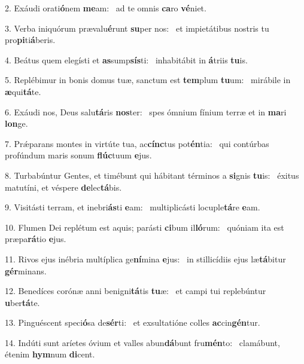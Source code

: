 2. Exáudi orati\textbf{ó}nem \textbf{me}am: \ast\  ad te omnis \textbf{ca}ro \textbf{vé}niet.\

3. Verba iniquórum prævalu\textbf{é}runt \textbf{su}per nos: \ast\  et impietátibus nostris tu pro\textbf{pi}ti\textbf{á}beris.\

4. Beátus quem elegísti et \textbf{as}sump\textbf{sís}ti: \ast\  inhabitábit in \textbf{á}triis \textbf{tu}is.\

5. Replébimur in bonis domus tuæ, sanctum est \textbf{tem}plum \textbf{tu}um: \ast\  mirábile in \textbf{æ}qui\textbf{tá}te.\

6. Exáudi nos, Deus salu\textbf{tá}ris \textbf{nos}ter: \ast\  spes ómnium fínium terræ et in \textbf{ma}ri \textbf{lon}ge.\

7. Prǽparans montes in virtúte tua, ac\textbf{cínc}tus pot\textbf{én}tia: \ast\  qui contúrbas profúndum maris sonum \textbf{flúc}tuum \textbf{e}jus.\

8. Turbabúntur Gentes, et timébunt qui hábitant términos a \textbf{si}gnis \textbf{tu}is: \ast\  éxitus matutíni, et véspere \textbf{de}lec\textbf{tá}bis.\

9. Visitásti terram, et inebri\textbf{ás}ti \textbf{e}am: \ast\  multiplicásti locuple\textbf{tá}re \textbf{e}am.\

10. Flumen Dei replétum est aquis; parásti \textbf{ci}bum il\textbf{ló}rum: \ast\  quóniam ita est præpa\textbf{rá}tio \textbf{e}jus.\

11. Rivos ejus inébria multíplica ge\textbf{ní}mina \textbf{e}jus: \ast\  in stillicídiis ejus læ\textbf{tá}bitur \textbf{gér}minans.\

12. Benedíces corónæ anni benigni\textbf{tá}tis \textbf{tu}æ: \ast\  et campi tui replebúntur \textbf{u}ber\textbf{tá}te.\

13. Pinguéscent speci\textbf{ó}sa de\textbf{sér}ti: \ast\  et exsultatióne colles \textbf{ac}cin\textbf{gén}tur.\

14. Indúti sunt aríetes óvium et valles abun\textbf{dá}bunt fru\textbf{mén}to: \ast\  clamábunt, étenim \textbf{hym}num \textbf{di}cent.\

